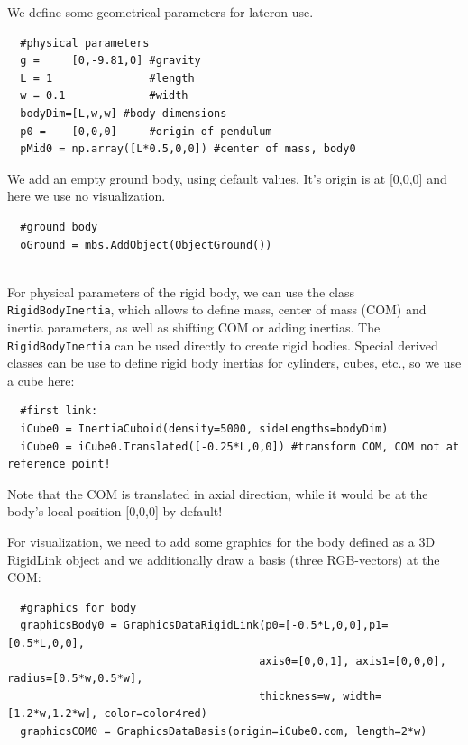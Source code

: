 \noindent We define some geometrical parameters for lateron use.
\pythonstyle\begin{lstlisting}
  #physical parameters
  g =     [0,-9.81,0] #gravity
  L = 1               #length
  w = 0.1             #width
  bodyDim=[L,w,w] #body dimensions
  p0 =    [0,0,0]     #origin of pendulum
  pMid0 = np.array([L*0.5,0,0]) #center of mass, body0
\end{lstlisting}

\noindent We add an empty ground body, using default values. It's origin is at [0,0,0] and here we use no visualization.
\pythonstyle\begin{lstlisting}
  #ground body
  oGround = mbs.AddObject(ObjectGround())
\end{lstlisting}

\horizontalRuler\\
\noindent For physical parameters of the rigid body, we can use the class \texttt{RigidBodyInertia}, which allows to define mass, center of mass (COM) and inertia parameters, as well as shifting COM or adding inertias.
The \texttt{RigidBodyInertia} can be used directly to create rigid bodies. Special derived classes can be use to define rigid body inertias for cylinders, cubes, etc., so we use a cube here:
\pythonstyle\begin{lstlisting}
  #first link:
  iCube0 = InertiaCuboid(density=5000, sideLengths=bodyDim)
  iCube0 = iCube0.Translated([-0.25*L,0,0]) #transform COM, COM not at reference point!
\end{lstlisting}
Note that the COM is translated in axial direction, while it would be at the body's local position [0,0,0] by default!

\noindent For visualization, we need to add some graphics for the body defined as a 3D RigidLink object and we additionally draw a basis (three RGB-vectors) at the COM:
\pythonstyle\begin{lstlisting}
  #graphics for body
  graphicsBody0 = GraphicsDataRigidLink(p0=[-0.5*L,0,0],p1=[0.5*L,0,0], 
                                       axis0=[0,0,1], axis1=[0,0,0], radius=[0.5*w,0.5*w], 
                                       thickness=w, width=[1.2*w,1.2*w], color=color4red)
  graphicsCOM0 = GraphicsDataBasis(origin=iCube0.com, length=2*w)
\end{lstlisting}

